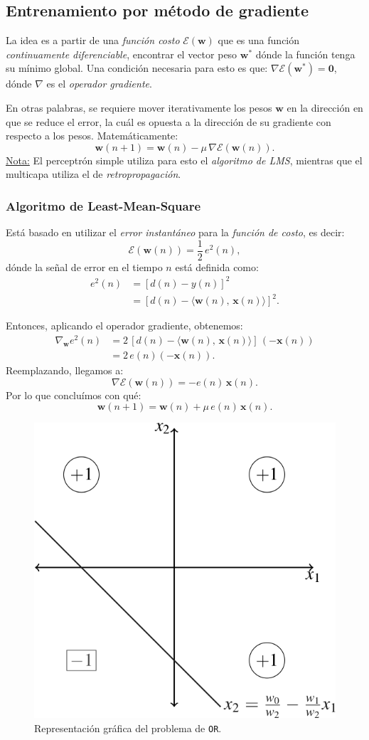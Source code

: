 \documentclass[10pt,a4paper]{article}
\begin{document}
\subsection{Entrenamiento por método de gradiente}

La idea es a partir de una \textit{función costo} $\mathcal{E}(\mathbf{w})$ que es una función \textit{continuamente diferenciable}, encontrar el vector peso $\mathbf{w^*}$ dónde la función tenga su mínimo global. Una condición necesaria para esto es que: $\nabla \mathcal{E}(\mathbf{w^*})=\mathbf{0}$, dónde $\nabla$ es el \textit{operador gradiente}. 

En otras palabras, se requiere mover iterativamente los pesos $\mathbf{w}$ en la dirección en que se reduce el error, la cuál es opuesta a la dirección de su gradiente con respecto a los pesos. Matemáticamente:
\[\mathbf{w}(n+1) = \mathbf{w}(n) - \mu \, \nabla \mathcal{E}(\mathbf{w}(n)).\]
\underline{Nota:} El perceptrón simple utiliza para esto el \textit{algoritmo de LMS}, mientras que el multicapa utiliza el de \textit{retropropagación}.

\subsubsection{Algoritmo de Least-Mean-Square}

\begin{multicols}{2}
Está basado en utilizar el \textit{error instantáneo} para la \textit{función de costo}, es decir:
\[\mathcal{E}(\mathbf{w}(n))=\frac{1}{2} \, e^2(n),\]
dónde la señal de error en el tiempo $n$ está definida como:
\begin{align*}
e^2(n)&=[d(n)-y(n)]^2 \\
&=[d(n)-\langle\mathbf{w}(n),\, \mathbf{x}(n)\rangle]^2.
\end{align*}

\columnbreak
Entonces, aplicando el operador gradiente, obtenemos:
\begin{align*}
\nabla_\mathbf{w} e^2(n) &= 2\,[d(n)-\langle\mathbf{w}(n),\, \mathbf{x}(n)\rangle]\,(-\mathbf{x}(n))\\
&=2\, e(n)(-\mathbf{x}(n)).
\end{align*}
Reemplazando, llegamos a:
\[\nabla \mathcal{E}(\mathbf{w}(n))=-e(n)\,\mathbf{x}(n).\]
Por lo que concluímos con qué:
\[\mathbf{w}(n+1) = \mathbf{w}(n) + \mu \, e(n)\,\mathbf{x}(n).\]
\end{multicols}

\begin{figure}
  \caption{Representación gráfica del problema de \texttt{OR}.}
  \label{fig:or}
  \centering
  \hbox{\includegraphics[width=.36\textwidth-\fboxrule-\fboxrule]{imgs/or_2.png}}
\end{figure}
\end{document}
